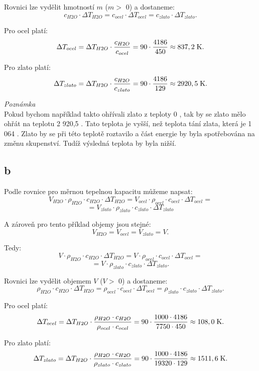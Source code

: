 \documentclass{article}
\begin{document}
Rovnici lze vydělit hmotností $m$ ($m >$ 0) a dostaneme:
$$
    c_{H2O} \cdot \Delta T_{H2O} = c_{ocel} \cdot \Delta T_{ocel} = c_{zlato} \cdot \Delta T_{zlato}.
$$

Pro ocel platí:
$$
    \Delta T_{ocel} = \Delta T_{H2O} \cdot \frac{c_{H2O}}{c_{ocel}} = 90 \cdot \frac{4 186}{450} \approx 837,2 \; \textrm{K}.
$$

Pro zlato platí:
$$
    \Delta T_{zlato} = \Delta T_{H2O} \cdot \frac{c_{H2O}}{c_{zlato}} = 90 \cdot \frac{4 186}{129} \approx 2 920,5 \; \textrm{K}.
$$

\textit{Poznámka}\\

Pokud bychom například takto ohřívali zlato z teploty 0 \ueqCELS, tak by se zlato mělo ohřát na teplotu 2 920,5 \ueqCELS. Tato teplota je vyšší, než teplota tání zlata, která je 1 064 \ueqCELS. Zlato by se při této teplotě roztavilo a část energie by byla spotřebována na změnu skupenství. Tudíž výsledná teplota by byla nižší.


\subsection{b}
Podle rovnice pro měrnou tepelnou kapacitu můžeme napsat:
$$
    V_{H2O} \cdot \rho_{H2O} \cdot c_{H2O} \cdot \Delta T_{H2O} = V_{ocel} \cdot \rho_{ocel} \cdot c_{ocel} \cdot \Delta T_{ocel} =
$$
$$
    = V_{zlato} \cdot \rho_{zlato} \cdot c_{zlato} \cdot \Delta T_{zlato}
$$

A zároveň pro tento příklad objemy jsou stejné:
$$
    V_{H2O} = V_{ocel} = V_{zlato} = V.
$$

Tedy:
$$
    V \cdot \rho_{H2O} \cdot c_{H2O} \cdot \Delta T_{H2O} = V \cdot \rho_{ocel} \cdot c_{ocel} \cdot \Delta T_{ocel} =
$$
$$
    =  V \cdot \rho_{zlato} \cdot c_{zlato} \cdot \Delta T_{zlato}.
$$

Rovnici lze vydělit objemem $V$ ($V >$ 0) a dostaneme:
$$
    \rho_{H2O} \cdot c_{H2O} \cdot \Delta T_{H2O} = \rho_{ocel} \cdot c_{ocel} \cdot \Delta T_{ocel} = \rho_{zlato} \cdot c_{zlato} \cdot \Delta T_{zlato}.
$$

Pro ocel platí:
$$
    \Delta T_{ocel} = \Delta T_{H2O} \cdot \frac{\rho_{H2O} \cdot c_{H2O}}{\rho_{ocel} \cdot c_{ocel}} = 90 \cdot \frac{1 000 \cdot 4 186}{7 750 \cdot 450} \approx 108,0 \; \textrm{K}.
$$

Pro zlato platí:
$$
    \Delta T_{zlato} = \Delta T_{H2O} \cdot \frac{\rho_{H2O} \cdot c_{H2O}}{\rho_{zlato} \cdot c_{zlato}} = 90 \cdot \frac{1 000 \cdot 4 186}{19 320 \cdot 129} \approx 1511,6 \; \textrm{K}.
$$
\end{document}
